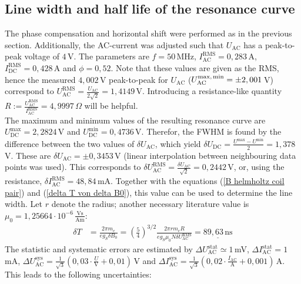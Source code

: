 \documentclass[a4paper,12pt]{article}
\newcommand{\kla}{}
\newcommand{\tecxt}{}
\begin{document}
\subsection{Line width and half life of the resonance curve}
The phase compensation and horizontal shift were performed as in the previous section. Additionally, the AC-current was adjusted such that $U_\tecxt\text{AC}$ has a peak-to-peak voltage of $4\,$V. The parameters are $f=50\,$MHz, $I_\tecxt\text{AC}^\tecxt\text{RMS}=0,283\,$A, $I_\tecxt\text{DC}^\tecxt\text{RMS}=0,428\,$A and $\phi=0,52$. Note that these values are given as the RMS, hence the measured $4,002\,$V peak-to-peak for $U_\tecxt\text{AC}$ ($U_\tecxt\text{AC}^\tecxt\text{max,\,min}=\pm 2,001\,$V) correspond to $U_\tecxt\text{AC}^\tecxt\text{RMS}=\frac{U_\tecxt\text{AC}}{2\sqrt{2}}=1,4149\,$V. Introducing a resistance-like quantity $R:=\frac{U_\tecxt\text{AC}^\tecxt\text{RMS}}{I_\tecxt\text{AC}^\tecxt\text{RMS}}=4,9997\,\Omega$ will be helpful.\\
The maximum and minimum values of the resulting resonance curve are $U_\tecxt\text{DC}^\tecxt\text{max}=2,2824\,$V and $U_\tecxt\text{DC}^\tecxt\text{min}=0,4736\,$V. Therefor, the FWHM is found by the difference between the two values of $\delta U_\tecxt\text{AC}$, which yield $\delta U_\tecxt\text{DC}=\frac{U^\tecxt\text{max}-U^\tecxt\text{min}}{2}=1,378\,$V. These are $\delta U_\tecxt\text{AC}=\pm 0,3453\,$V (linear interpolation between neighbouring data points was used). This corresponds to $\delta U_\tecxt\text{AC}^\tecxt\text{RMS}=\frac{\delta U_\tecxt\text{AC}}{\sqrt{2}}=0,2442\,$V, or, using the resistance, $\delta I_\tecxt\text{AC}^\tecxt\text{RMS}=48,84\,$mA. Together with the equations (\ref{B helmholtz coil pair}) and (\ref{delta T von delta B0}), this value can be used to determine the line width. Let $r$ denote the radius; another necessary literature value is $\mu_0=1,25664\cdot 10^{-6}\,\frac{\tecxt\text{Vs}}{\tecxt\text{Am}}$:
\begin{align*}
\delta T&=\frac{2\pi m_e}{eg_S\delta B_0}=\kla\left( {\frac{5}{4}} \right)^{3/2}\frac{2\pi rm_eR}{eg_S\mu_0N\delta U_\tecxt\text{AC}^\tecxt\text{RMS}}=\underline{89,63\,\tecxt\text{ns}}
\end{align*}
The statistic and systematic errors are estimated by $\Delta U_\tecxt\text{AC}^\tecxt\text{stat}\simeq 1\,$mV, $\Delta I_\tecxt\text{AC}^\tecxt\text{stat}=1\,$mA, $\Delta U_\tecxt\text{AC}^\tecxt\text{sys}=\frac{1}{\sqrt{3}}\kla\left( {0,03\cdot\frac{U}{\tecxt\text{V}}+0,01} \right)\,$V and $\Delta I_\tecxt\text{AC}^\tecxt\text{sys}=\frac{1}{\sqrt{3}}\kla\left( {0,02\cdot\frac{I_\tecxt\text{AC}}{\tecxt\text{A}}+0,001} \right)\,$A. This leads to the following uncertainties:
\end{document}
